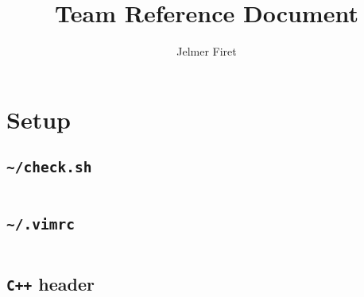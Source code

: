 \documentclass[8pt,a4paper,landscape,oneside]{amsart}
\title{Team Reference Document}
\author{Jelmer Firet}
\begin{document}
	\begin{multicols*}{2}
		\maketitle
		\vspace*{-45pt}
		\thispagestyle{fancy}
		\begin{multicols}{2}
			\tableofcontents
			\columnbreak
			\vfill\null
		\end{multicols}
		\vfill\null
		\columnbreak
		\section{Setup} %
		\begin{multicols*}{2}
			\subsection{\texttt{\textasciitilde/check.sh}}
			\inputminted{sh}{_code/setup/check.sh}
			\subsection{\texttt{\textasciitilde/.vimrc}}
			\inputminted{sh}{_code/setup/vimrc.sh}
			\columnbreak
			\subsection{\texttt{C++} header}
			\inputminted{cpp}{_code/setup/header.cpp}
			\vfill\null
		\end{multicols*}

\end{multicols*}
\end{document}
